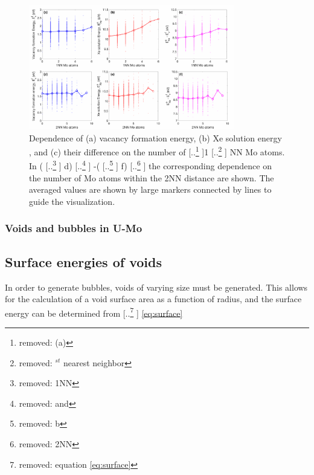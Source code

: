 \documentclass[review]{elsarticle}
\providecommand{\DIFaddtex}[1]{{\protect\color{blue} \sf #1}} %
\providecommand{\DIFdeltex}[1]{{\protect\color{red} [..\footnote{removed: #1} ]}} %
\providecommand{\DIFaddbegin}{} %
\providecommand{\DIFaddend}{} %
\providecommand{\DIFdelbegin}{} %
\providecommand{\DIFdelend}{} %
\providecommand{\DIFaddFL}[1]{\DIFadd{#1}} %
\providecommand{\DIFdelFL}[1]{\DIFdel{#1}} %
\providecommand{\DIFaddbeginFL}{} %
\providecommand{\DIFaddendFL}{} %
\providecommand{\DIFdelbeginFL}{} %
\providecommand{\DIFdelendFL}{} %
\providecommand{\DIFadd}[1]{\texorpdfstring{\DIFaddtex{#1}}{#1}} %
\providecommand{\DIFdel}[1]{\texorpdfstring{\DIFdeltex{#1}}{}} %
\newcommand{\DIFscaledelfig}{0.5}
\newlength{\DIFdelgraphicswidth} %
\newlength{\DIFdelgraphicsheight} %
\newcommand{\DIFaddincludegraphics}[2][]{{\color{blue}\fbox{\DIFOincludegraphics[#1]{#2}}}} %
\newcommand{\DIFdelincludegraphics}[2][]{%
\sbox{\DIFdelgraphicsbox}{\DIFOincludegraphics[#1]{#2}}%
\settoboxwidth{\DIFdelgraphicswidth}{\DIFdelgraphicsbox} %
\settoboxtotalheight{\DIFdelgraphicsheight}{\DIFdelgraphicsbox} %
\scalebox{\DIFscaledelfig}{%
\parbox[b]{\DIFdelgraphicswidth}{\usebox{\DIFdelgraphicsbox}\\[-\baselineskip] \rule{\DIFdelgraphicswidth}{0em}}\llap{\resizebox{\DIFdelgraphicswidth}{\DIFdelgraphicsheight}{%
\setlength{\unitlength}{\DIFdelgraphicswidth}%
\begin{picture}(1,1)%
\thicklines\linethickness{2pt} %
{\color[rgb]{1,0,0}\put(0,0){\framebox(1,1){}}}%
{\color[rgb]{1,0,0}\put(0,0){\line( 1,1){1}}}%
{\color[rgb]{1,0,0}\put(0,1){\line(1,-1){1}}}%
\end{picture}%
}\hspace*{3pt}}} %
} %
\DeclareRobustCommand{\DIFaddbegin}{\DIFOaddbegin \let\includegraphics\DIFaddincludegraphics} %
\DeclareRobustCommand{\DIFaddend}{\DIFOaddend \let\includegraphics\DIFOincludegraphics} %
\DeclareRobustCommand{\DIFdelbegin}{\DIFOdelbegin \let\includegraphics\DIFdelincludegraphics} %
\DeclareRobustCommand{\DIFdelend}{\DIFOaddend \let\includegraphics\DIFOincludegraphics} %
\DeclareRobustCommand{\DIFaddbeginFL}{\DIFOaddbeginFL \let\includegraphics\DIFaddincludegraphics} %
\DeclareRobustCommand{\DIFaddendFL}{\DIFOaddendFL \let\includegraphics\DIFOincludegraphics} %
\DeclareRobustCommand{\DIFdelbeginFL}{\DIFOdelbeginFL \let\includegraphics\DIFdelincludegraphics} %
\DeclareRobustCommand{\DIFdelendFL}{\DIFOaddendFL \let\includegraphics\DIFOincludegraphics} %
\begin{document}
\begin{figure}[h!]
 \centering
 \DIFdelbeginFL %
\DIFdelendFL \DIFaddbeginFL \includegraphics[width=0.8\textwidth]{MoNN} 
 \DIFaddendFL \caption{Dependence of \DIFaddbeginFL \DIFaddFL{(a) vacancy formation energy, (b) }\DIFaddendFL Xe solution energy\DIFaddbeginFL \DIFaddFL{, and (c) their difference }\DIFaddendFL on the number of \DIFdelbeginFL \DIFdelFL{(a) }\DIFdelendFL 1 \DIFdelbeginFL \DIFdelFL{$^{st}$ nearest neighbor }\DIFdelendFL \DIFaddbeginFL \DIFaddFL{NN Mo atoms. In }\DIFaddendFL (\DIFdelbeginFL \DIFdelFL{1NN}\DIFdelendFL \DIFaddbeginFL \DIFaddFL{d}\DIFaddendFL )\DIFdelbeginFL \DIFdelFL{and }\DIFdelendFL \DIFaddbeginFL \DIFaddFL{-}\DIFaddendFL (\DIFdelbeginFL \DIFdelFL{b}\DIFdelendFL \DIFaddbeginFL \DIFaddFL{f}\DIFaddendFL ) \DIFdelbeginFL \DIFdelFL{2NN }\DIFdelendFL \DIFaddbeginFL \DIFaddFL{the corresponding dependence on the number of }\DIFaddendFL Mo atoms \DIFaddbeginFL \DIFaddFL{within the 2NN distance are shown}\DIFaddendFL . \DIFaddbeginFL \DIFaddFL{The averaged values are shown by large markers connected by lines to guide the visualization. }\DIFaddendFL }
 \label{fig:MoNN}
\end{figure}

\FloatBarrier

\subsubsection{Voids and bubbles in U-Mo}

\subsection{Surface energies of voids}

In order to generate bubbles, voids of varying size must be generated. This allows for the calculation of a void surface area as a function of radius, and the surface energy can be determined from \DIFdelbegin \DIFdel{equation \ref{eq:surface}
}\DIFdelend \DIFaddbegin \DIFadd{\cref{eq:surface}
}\DIFaddend 
\end{document}
